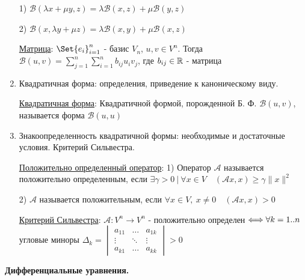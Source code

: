 \documentclass[12pt]{article}
\begin{document}
\begin{enumerate}
        1) $\mathcal{B}(\lambda x + \mu y, z) = \lambda \mathcal{B}(x, z) + \mu \mathcal{B}(y, z)$

        2) $\mathcal{B}(x, \lambda y + \mu z) = \lambda \mathcal{B}(x, y) + \mu \mathcal{B}(x, z)$

        \hyperlink{bilinearformmatrix}{Матрица}: $\Set{e_i}_{i=1}^n$ - базис $V_n$, $u, v \in V^n$. Тогда $\mathcal{B}(u, v) =
        \sum_{j = 1}^{n}\sum_{i = 1}^{n} b_{ij} u_i v_j$, где $b_{ij} \in \mathbb{R}$ - матрица


        \item Квадратичная форма: определения, приведение к каноническому виду.

        \hyperlink{quadraticform}{Квадратичная форма}: Квадратичной формой, порожденной Б. Ф. $\mathcal{B}(u, v)$, называется форма $\mathcal{B}(u, u)$


        \item Знакоопределенность квадратичной формы: необходимые и достаточные условия. Критерий Сильвестра.

        \hyperlink{positivedefinedoperator}{Положительно определенный оператор}: 1) Оператор $\mathcal{A}$ называется положительно определенным, если
        $\exists \gamma > 0 \ | \ \forall x \in V \quad (\mathcal{A}x, x) \geq \gamma \|x\|^2$

        2) $\mathcal{A}$ называется положительным, если
        $\forall x \in V, \ x \neq 0 \quad (\mathcal{A}x, x) > 0$


        \hyperlink{criterionSilvester}{Критерий Сильвестра}: $\mathcal{A}: V^n \to V^n$ - положительно определен $\Longleftrightarrow \\ \forall k = 1..n $ угловые миноры $ \Delta_k =
        \begin{vmatrix}a_{11} & \dots & a_{1k} \\ \vdots & \ddots & \vdots \\ a_{k1} & \dots & a_{kk}\end{vmatrix} > 0$


    \end{enumerate}

    \begin{center}
        \textbf{Дифференциальные уравнения.}
    \end{center}
\end{document}
